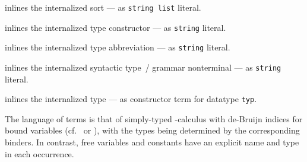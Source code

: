\begin{isabellebody}
\begin{isamarkuptext}
\begin{description}
  \item {} inlines the internalized sort 
  --- as \verb|string list| literal.

  \item {} inlines the internalized type
  constructor  --- as \verb|string| literal.

  \item {} inlines the internalized type
  abbreviation  --- as \verb|string| literal.

  \item {} inlines the internalized syntactic
  type~/ grammar nonterminal  --- as \verb|string|
  literal.

  \item {} inlines the internalized type 
  --- as constructor term for datatype \verb|typ|.

  \end{description}%
\end{isamarkuptext}%
\isamarkuptrue%
%
\endisatagmlantiq
{\isafoldmlantiq}%
%
\isadelimmlantiq
%
\endisadelimmlantiq
%
\isamarkuptrue%
%
\begin{isamarkuptext}%
The language of terms is that of simply-typed -calculus
  with de-Bruijn indices for bound variables (cf.\ \cite{debruijn72}
  or \cite{paulson-ml2}), with the types being determined by the
  corresponding binders.  In contrast, free variables and constants
  have an explicit name and type in each occurrence.


\end{isamarkuptext}
\end{isabellebody}
